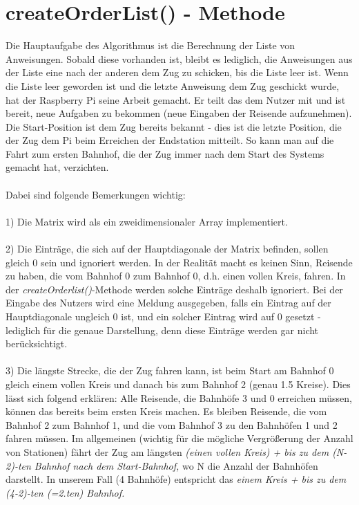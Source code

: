 \section{createOrderList() - Methode}
Die Hauptaufgabe des Algorithmus ist die Berechnung der Liste von Anweisungen. Sobald diese vorhanden ist, bleibt es lediglich, die Anweisungen aus der Liste eine nach der anderen dem Zug zu schicken, bis die Liste leer ist. Wenn die Liste leer geworden ist und die letzte Anweisung dem Zug geschickt wurde, hat der Raspberry Pi seine Arbeit gemacht. Er teilt das dem Nutzer mit und ist bereit, neue Aufgaben zu bekommen (neue Eingaben der Reisende aufzunehmen). Die Start-Position ist dem Zug bereits bekannt - dies ist die letzte Position, die der Zug dem Pi beim Erreichen der Endstation mitteilt. So kann man auf die Fahrt zum ersten Bahnhof, die der Zug immer nach dem Start des Systems gemacht hat, verzichten.\\
\\
Dabei sind folgende Bemerkungen wichtig:\\
\\
1) Die Matrix wird als ein zweidimensionaler Array implementiert.\\
\\
2) Die Einträge, die sich auf der Hauptdiagonale der Matrix befinden, sollen gleich 0 sein und ignoriert werden. In der Realität macht es keinen Sinn, Reisende zu haben, die vom Bahnhof 0 zum Bahnhof 0, d.h. einen vollen Kreis, fahren. In der \textit{createOrderlist()}-Methode werden solche Einträge deshalb ignoriert. Bei der Eingabe des Nutzers wird eine Meldung ausgegeben, falls ein Eintrag auf der Hauptdiagonale ungleich 0 ist, und ein solcher Eintrag wird auf 0 gesetzt - lediglich für die genaue Darstellung, denn diese Einträge werden gar nicht berücksichtigt.\\
\\
3) Die längste Strecke, die der Zug fahren kann, ist beim Start am Bahnhof 0 gleich einem vollen Kreis und danach bis zum Bahnhof 2 (genau 1.5 Kreise). Dies lässt sich folgend erklären: Alle Reisende, die Bahnhöfe 3 und 0 erreichen müssen, können das bereits beim ersten Kreis machen. Es bleiben Reisende, die vom Bahnhof 2 zum Bahnhof 1, und die vom Bahnhof 3 zu den Bahnhöfen 1 und 2 fahren müssen. Im allgemeinen (wichtig für die mögliche Vergrößerung der Anzahl von Stationen) fährt der Zug am längsten \textit{(einen vollen Kreis) + bis zu dem (N-2)-ten Bahnhof nach dem Start-Bahnhof,} wo N die Anzahl der Bahnhöfen darstellt. In unserem Fall (4 Bahnhöfe) entspricht das \textit{einem Kreis + bis zu dem (4-2)-ten (=2.ten) Bahnhof.}\\
